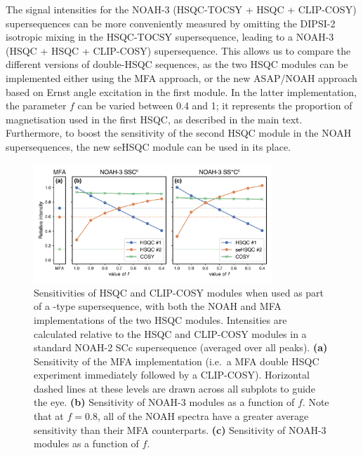 The signal intensities for the NOAH-3  (HSQC-TOCSY + HSQC + CLIP-COSY) supersequences can be more conveniently measured by omitting the DIPSI-2 isotropic mixing in the HSQC-TOCSY supersequence, leading to a NOAH-3  (HSQC + HSQC + CLIP-COSY) supersequence.
This allows us to compare the different versions of double-HSQC sequences, as the two HSQC modules can be implemented either using the MFA approach, or the new ASAP/NOAH approach based on Ernst angle excitation in the first module.
In the latter implementation, the parameter $f$ can be varied between 0.4 and 1; it represents the proportion of  magnetisation used in the first HSQC, as described in the main text.
Furthermore, to boost the sensitivity of the second HSQC module in the NOAH supersequences, the new seHSQC module can be used in its place.

\begin{figure}
    \centering
    \includegraphics[width=0.8\textwidth]{./figures/ssc_comparisons.png}
    \caption{
        Sensitivities of HSQC and CLIP-COSY modules when used as part of a -type supersequence, with both the NOAH and MFA implementations of the two HSQC modules.
        Intensities are calculated relative to the HSQC and CLIP-COSY modules in a standard NOAH-2 SCc supersequence (averaged over all peaks).
        \textbf{(a)} Sensitivity of the MFA implementation (i.e.\ a MFA double HSQC experiment immediately followed by a CLIP-COSY).
        Horizontal dashed lines at these levels are drawn across all subplots to guide the eye.
        \textbf{(b)} Sensitivity of NOAH-3  modules as a function of $f$.
        Note that at $f = 0.8$, all of the NOAH spectra have a greater average sensitivity than their MFA counterparts.
        \textbf{(c)} Sensitivity of NOAH-3  modules as a function of $f$.
        \andro{}
    }
    \label{fig:ssc_comparisons}
\end{figure}

